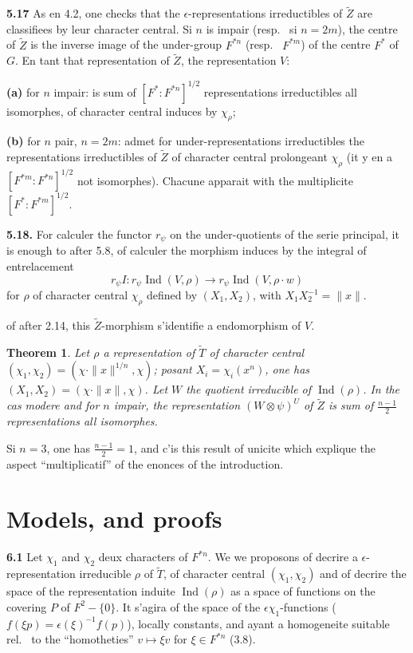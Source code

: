 \documentclass[12pt,a4paper]{article}
\theoremstyle{plain}
\newtheorem{theorem}{Theorem}[section]
\theoremstyle{definition}
\theoremstyle{remark}
\DeclareMathOperator{\Ind}{Ind}
\newcommand{\wt}{\widetilde}
\begin{document}
\textbf{5.17} As en 4.2, one checks that the $\epsilon$-representations irreductibles of $\wt{Z}$ are classifiees by leur character central. Si $n$ is impair (resp.
\ si $n = 2m$), the centre of $\wt{Z}$ is the inverse image of the under-group $F^{*n}$ (resp.
\ $F^{*m}$) of the centre $F^*$ of $G$. En tant that representation of $\wt{Z}$, the representation $V$:

\textbf{(a)} for $n$ impair: is sum of $[F^* : F^{*n}]^{1/2}$ representations irreductibles all isomorphes, of character central induces by $\chi_\rho$;

\textbf{(b)} for $n$ pair, $n = 2m$: admet for under-representations irreductibles the representations irreductibles of $\wt{Z}$ of character central prolongeant $\chi_\rho$ (it y en a $[F^{*m} : F^{*n}]^{1/2}$ not isomorphes). Chacune apparait with the multiplicite $[F^* : F^{*m}]^{1/2}$.

\textbf{5.18.} For calculer the functor $r_\psi$ on the under-quotients of the serie principal, it is enough to after 5.8, of calculer the morphism induces by the integral of entrelacement
\begin{equation}\label{eq:5.18.1}
r_\psi I : r_\psi \Ind(V, \rho) \longrightarrow r_\psi \Ind(V, \rho \cdot w)
\tag{5.18.1}
\end{equation}
for $\rho$ of character central $\chi_\rho$ defined by $(X_1, X_2)$, with $X_1 X_2^{-1} = \|x\|$.

of after 2.14, this $\wt{Z}$-morphism s'identifie a endomorphism of $V$.

\begin{theorem}\label{thm:5.19}
Let $\rho$ a representation of $\wt{T}$ of character central $(\chi_1, \chi_2) = (\chi \cdot \|x\|^{1/n}, \chi)$; posant $X_i = \chi_i(x^n)$, one has $(X_1, X_2) = (\chi \cdot \|x\|, \chi)$. Let $W$ the quotient irreducible of $\Ind(\rho)$. In the cas modere and for $n$ impair, the representation $(W \otimes \psi)^U$ of $\wt{Z}$ is sum of $\frac{n-1}{2}$ representations all isomorphes.
\end{theorem}

Si $n = 3$, one has $\frac{n-1}{2} = 1$, and c'is this result of unicite which explique the aspect ``multiplicatif'' of the enonces of the introduction.


\section{Models, and proofs}

\textbf{6.1} Let $\chi_1$ and $\chi_2$ deux characters of $F^{*n}$. We we proposons of decrire a $\epsilon$-representation irreducible $\rho$ of $\wt{T}$, of character central $(\chi_1, \chi_2)$ and of decrire the space of the representation induite $\Ind(\rho)$ as a space of functions on the covering $P$ of $F^2 - \{0\}$. It s'agira of the space of the $\epsilon \chi_1$-functions ($f(\xi p) = \epsilon(\xi)^{-1} f(p)$), locally constants, and ayant a homogeneite suitable rel.
\ to the ``homotheties'' $v \mapsto \xi v$ for $\xi \in F^{*n}$ (3.8).
\end{document}
